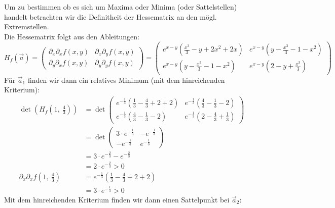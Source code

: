 \documentclass[10pt]{article}
\newcommand{\secondpage}{
	\newpage 
	\setlength{\headheight}{0cm}
}
\begin{document}
\secondpage

Um zu bestimmen ob es sich um Maxima oder Minima (oder Sattelstellen)
handelt betrachten wir die Definitheit der Hessematrix an den mögl. 
Extremstellen.\\
Die Hessematrix folgt aus den Ableitungen:
\[
	H_f(\vec a)
	= \begin{pmatrix}
		\partial_x\partial_x f(x,y) &
		\partial_x\partial_y f(x,y) \\
		\partial_y\partial_x f(x,y) &
		\partial_y\partial_y f(x,y)
	\end{pmatrix}
	= \begin{pmatrix}
	e^{x-y} \left(\frac{x^3}{3} - y + 2x^2 + 2x\right) &
	e^{x-y} \left( y - \frac{x^3}3 - 1 - x^2\right) \\
	e^{x-y} \left( y - \frac{x^3}3 - 1 - x^2\right) &
	e^{x-y} \left(2 -y + \frac{x^3}3 \right)
	\end{pmatrix}
\]
Für $\vec a_1$ finden wir dann ein relatives Minimum (mit dem hinreichenden Kriterium):
\begin{align*}
	\det \left(H_f\left(1, \ \frac 43 \right) \right)
	&= \det
	\begin{pmatrix}
	e^{-\frac13} \left(\frac{1}{3} - \frac43 + 2 + 2\right) &
	e^{-\frac13} \left( \frac43 - \frac{1}3 - 2\right) \\
	e^{-\frac13} \left( \frac43 - \frac{1}3 - 2 \right) &
	e^{-\frac13} \left(2 - \frac43 + \frac{1}3 \right)
	\end{pmatrix} \\
	&= \det
	\begin{pmatrix}
	3 \cdot e^{-\frac13}&
	-e^{-\frac13} \\
	-e^{-\frac13} &
	e^{-\frac13}
	\end{pmatrix} \\
	&= 3 \cdot e^{-\frac{2}{3}} - e^{-\frac{2}{3}} \\
	&= 2 \cdot e^{-\frac23} > 0 \\
	\partial_x\partial_x f\left(1, \ \frac 43 \right) 
	&= e^{-\frac13} \left(\frac{1}{3} - \frac43 + 2 + 2\right) \\
	&= 3 \cdot e^{-\frac13} > 0
\end{align*}
Mit dem hinreichenden Kriterium finden wir dann einen Sattelpunkt bei
$\vec a_2$:
\end{document}
